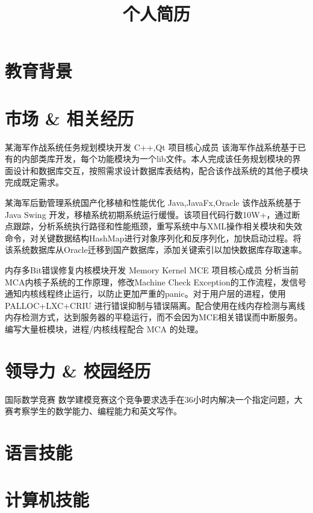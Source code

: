 \documentclass[11pt,a4paper]{moderncv}
\title{个人简历}                      %
\begin{document}
\maketitle

\section{教育背景}


\section{市场 \& 相关经历}
\renewcommand{\baselinestretch}{1.2}
{某海军作战系统任务规划模块开发}
{C++,Qt}
{}{项目核心成员}
{该海军作战系统基于已有的内部类库开发，每个功能模块为一个lib文件。本人完成该任务规划模块的界面设计和数据库交互，按照需求设计数据库表结构，配合该作战系统的其他子模块完成既定需求。}

{某海军后勤管理系统国产化移植和性能优化}
{Java,JavaFx,Oracle}
{}{}
{该作战系统基于 Java Swing 开发，移植系统初期系统运行缓慢。该项目代码行数10W+，通过断点跟踪，分析系统执行路径和性能瓶颈，重写系统中与XML操作相关模块和失效命令，对关键数据结构HashMap进行对象序列化和反序列化，加快启动过程。将该系统数据库从Oracle迁移到国产数据库，添加关键索引以加快数据库存取速率。}

{内存多Bit错误修复内核模块开发}
{Memory Kernel MCE}
{}{项目核心成员}
{分析当前MCA内核子系统的工作原理，修改Machine Check Exception的工作流程，发信号通知内核线程终止运行，以防止更加严重的panic。对于用户层的进程，使用PALLOC+LXC+CRIU 进行错误抑制与错误隔离。配合使用在线内存检测与离线内存检测方式，达到服务器的平稳运行，而不会因为MCE相关错误而中断服务。编写大量桩模块，进程/内核线程配合 MCA 的处理。}


\section{领导力 \& 校园经历} %
{国际数学竞赛}{}{}{}{}
{数学建模竞赛}{}{}{}{这个竞争要求选手在36小时内解决一个指定问题，大赛考察学生的数学能力、编程能力和英文写作。}

\section{语言技能}

\section{计算机技能}

\closesection{}                   %
\renewcommand{\listitemsymbol}{-} %
\end{document}

